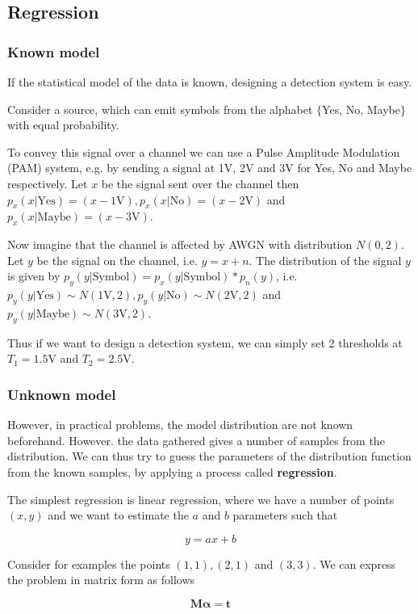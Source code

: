 \documentclass[oneside,onecolumn]{report}
\begin{document}
\subsection{Regression}
\subsubsection{Known model}

If the statistical model of the data is known, designing a detection system is easy.

Consider a source, which can emit symbols from the alphabet $\{$Yes, No, Maybe$\}$ with equal probability.

To convey this signal over a channel we can use a Pulse Amplitude Modulation (PAM) system, e.g. by sending a signal at 1V, 2V and 3V for Yes, No and Maybe respectively.
Let $x$ be the signal sent over the channel then $p_x(x|\text{Yes})=(x-1\text{V}),p_x(x|\text{No})=(x-2\text{V})$ and $p_x(x|\text{Maybe})=(x-3\text{V})$.

Now imagine that the channel is affected by AWGN with distribution $N(0,2)$. Let $y$ be the signal on the channel, i.e. $y=x+n$.
The distribution of the signal $y$ is given by $p_y(y|\text{Symbol})=p_x(y|\text{Symbol})*p_n(y)$, i.e. $p_y(y|\text{Yes}) \sim N(1\text{V}, 2),p_y(y|\text{No}) \sim N(2\text{V},2)$ and $p_y(y|\text{Maybe}) \sim N(3\text{V},2)$.

Thus if we want to design a detection system, we can simply set 2 thresholds at $T_1=1.5$V and $T_2=2.5$V.
\subsubsection{Unknown model}

However, in practical problems, the model distribution are not known beforehand. However. the data gathered gives a number of samples from the distribution. We can thus try to guess the parameters of the distribution function from the known samples, by applying a process called \textbf{regression}.

The simplest regression is linear regression, where we have a number of points $(x,y)$ and we want to estimate the $a$ and $b$ parameters such that

$$ y = ax + b $$

Consider for examples the points $(1,1), (2,1)$ and $(3,3)$. We can express the problem in matrix form as follows

$$ \bm M \bm \alpha = \bm t $$
\end{document}
